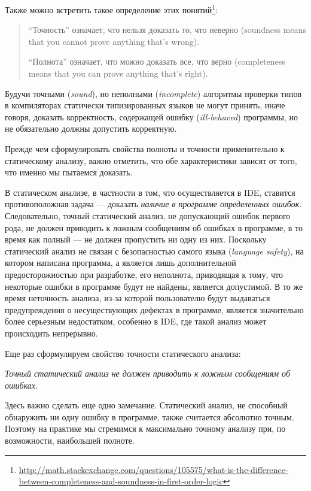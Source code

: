 Также можно встретить такое определение этих
понятий\footnote{\url{http://math.stackexchange.com/questions/105575/what-is-the-difference-between-completeness-and-soundness-in-first-order-logic}}:

\begin{quote}
``Точность'' означает, что нельзя доказать то, что неверно (soundness means that
you cannot prove anything that's wrong).

``Полнота'' означает, что можно доказать все, что верно (completeness means that
you can prove anything that's right).
\end{quote}

Будучи точными (\emph{sound}), но неполными (\emph{incomplete}) алгоритмы
проверки типов в компиляторах статически типизированных языков не
могут принять, иначе говоря, доказать корректность, содержащей ошибку (\emph{ill-behaved})
программы, но не обязательно должны допустить корректную.

Прежде чем сформулировать свойства полноты и точности применительно к
статическому анализу, важно отметить, что обе характеристики зависят от того,
что именно мы пытаемся доказать.

В статическом анализе, в частности в том, что осуществляется в IDE, ставится
противоположная задача --- доказать \emph{наличие в программе определенных
  ошибок}.  Следовательно, точный статический анализ, не допускающий ошибок
первого рода, не должен приводить к ложным сообщениям об ошибках в программе, в
то время как полный --- не должен пропустить ни одну из них. Поскольку
статический анализ не связан с безопасностью самого языка (\emph{language
  safety}), на котором написана программа, а является лишь дополнительной
предосторожностью при разработке, его неполнота, приводящая к тому, что
некоторые ошибки в программе будут не найдены, является допустимой. В то же
время неточность анализа, из-за которой пользователю будут выдаваться
предупреждения о несуществующих дефектах в программе, является значительно более
серьезным недостатком, особенно в IDE, где такой анализ может происходить
непрерывно.

Еще раз сформулируем свойство точности статического анализа:

\emph{Точный статический анализ не должен приводить к ложным сообщениям об 
ошибках.}

Здесь важно сделать еще одно замечание. Статический анализ, не способный
обнаружить ни одну ошибку в программе, также считается абсолютно точным. Поэтому
на практике мы стремимся к максимально точному анализу при, по возможности,
наибольшей полноте.

